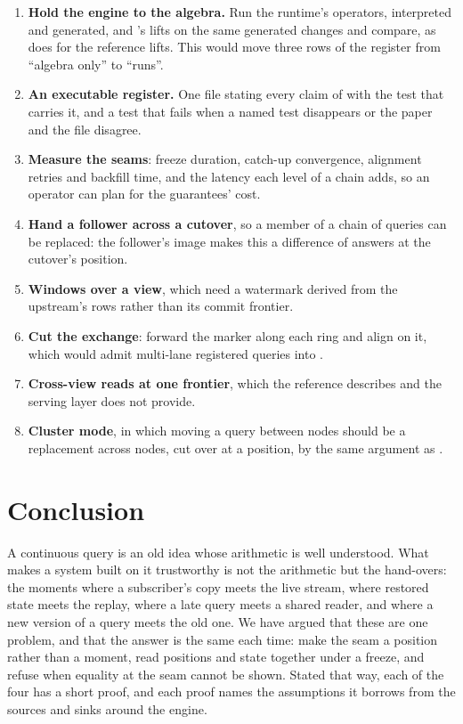 \documentclass[11pt,a4paper]{article}
\renewcommand{\_}{\oldunderscore\allowbreak}
\newcommand{\cls}[1]{\texttt{\pvbreakable{#1}}}
\newcommand{\code}[1]{\texttt{\pvbreakable{#1}}}
\begin{document}
\begin{enumerate}[leftmargin=*,itemsep=3pt]
\item \textbf{Hold the engine to the algebra.} Run the runtime's operators, interpreted and generated,
      and \code{pravaha-algebra}'s lifts on the same generated changes and compare, as
      \cls{IncrementalOracleTest} does for the reference lifts. This would move three rows of the register
      from ``algebra only'' to ``runs''.
\item \textbf{An executable register.} One file stating every claim of  with the
      test that carries it, and a test that fails when a named test disappears or the paper and the file
      disagree.
\item \textbf{Measure the seams}: freeze duration, catch-up convergence, alignment retries and backfill
      time, and the latency each level of a chain adds, so an operator can plan for the guarantees' cost.
\item \textbf{Hand a follower across a cutover}, so a member of a chain of queries can be replaced: the
      follower's image makes this a difference of answers at the cutover's position.
\item \textbf{Windows over a view}, which need a watermark derived from the upstream's rows rather than
      its commit frontier.
\item \textbf{Cut the exchange}: forward the marker along each ring and align on it, which would admit
      multi-lane registered queries into .
\item \textbf{Cross-view reads at one frontier}, which the reference \cls{Frontier} describes and the
      serving layer does not provide.
\item \textbf{Cluster mode}, in which moving a query between nodes should be a replacement across nodes,
      cut over at a position, by the same argument as .
\end{enumerate}

\section{Conclusion}\label{sec:conclusion}

A continuous query is an old idea whose arithmetic is well understood. What makes a system built on it
trustworthy is not the arithmetic but the hand-overs: the moments where a subscriber's copy meets the
live stream, where restored state meets the replay, where a late query meets a shared reader, and where
a new version of a query meets the old one. We have argued that these are one problem, and that the
answer is the same each time: make the seam a position rather than a moment, read positions and state
together under a freeze, and refuse when equality at the seam cannot be shown. Stated that way, each of
the four has a short proof, and each proof names the assumptions it borrows from the sources and sinks
around the engine.
\end{document}
